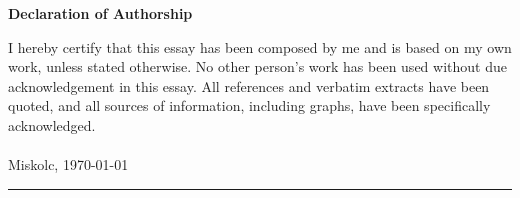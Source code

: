 \documentclass[11pt, a4paper, oneside]{Thesis} %
\begin{document}
\thispagestyle{empty}
{} 
\vfil
\vskip 60pt
\begin{center}{\huge\bf Declaration of Authorship\par}\end{center}

I hereby certify that this essay has been composed by me and is based on my own work, unless stated otherwise.
No other person's work has been used without due acknowledgement in this essay.
All references and verbatim extracts have been quoted, and all sources of information, including graphs, have been specifically acknowledged.
\paragraph*{}
Miskolc, \today \\

\vspace{2cm}
\begin{minipage}{0.4\textwidth}
\begin{center}
\rule{5cm}{0.5mm} \\
\authornames
\end{center}
\end{minipage}

\clearpage %

\tableofcontents
\newpage











\appendix

%
\end{document}
